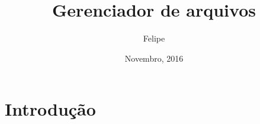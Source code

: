 \documentclass{article}
\title{Gerenciador de arquivos}
\author{Felipe}
\date{Novembro, 2016}
\begin{document}
\maketitle

\section{Introdução}
\end{document}
